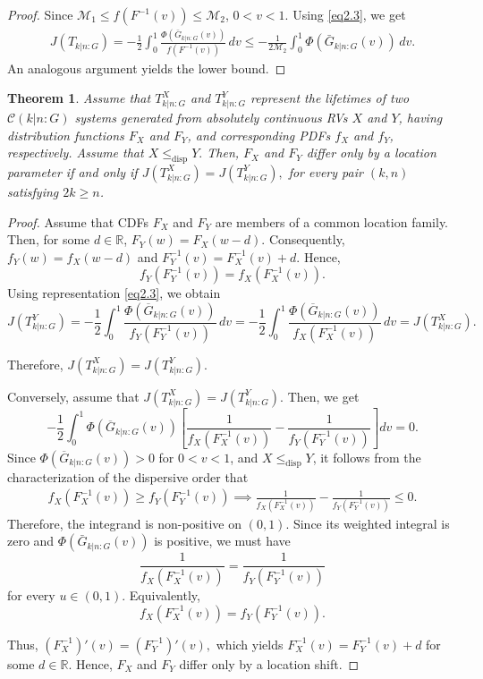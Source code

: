 \documentclass[12pt,a4paper]{article}
\numberwithin{equation}{section}
\newtheorem{theorem}{Theorem}[section]
\begin{document}
\begin{proof}
    Since $\mathcal M_1\leq f(F^{-1}(v))\leq \mathcal M_2$, $0<v<1$. Using \eqref{eq2.3}, we get
    \begin{align*}
        J(T_{k|n:G})=-\frac{1}{2}\int_0^1 \frac{\Phi(\bar G_{k|n:G}(v))}{f(F^{-1}(v))}\,dv\leq -\frac{1}{2\mathcal M_2}\int_0^1 \Phi(\bar G_{k|n:G}(v))\,dv.
    \end{align*}
   An analogous argument yields the lower bound.
    \end{proof}
 \begin{theorem}\label{th2.5}
Assume that $T_{k|n:G}^{X}$ and $T_{k|n:G}^{Y}$ represent the lifetimes of two $\mathcal C(k|n{:}G)$ systems generated from absolutely continuous RVs $X$ and $Y$, having distribution functions $F_X$ and $F_Y$, and corresponding PDFs $f_X$ and $f_Y$, respectively. Assume that $X \leq_{\mathrm{disp}} Y.$
Then, $F_X$ and $F_Y$ differ only by a location parameter if and only if ${J}\!\left(T_{k|n:G}^{X}\right)
=
{J}\!\left(T_{k|n:G}^{Y}\right),$
for every pair $(k,n)$ satisfying $2k\ge n$.
\end{theorem}
\begin{proof}
Assume that CDFs $F_X$ and $F_Y$ are members of a common location family. Then, for some $d\in\mathbb{R}$,
$
F_Y(w)=F_X(w-d).
$
Consequently,
$
f_Y(w)=f_X(w-d)
$
and
$
F_Y^{-1}(v)=F_X^{-1}(v)+d.
$
Hence,
$$
f_Y(F_Y^{-1}(v))
=
f_X(F_X^{-1}(v)).
$$
Using representation \eqref{eq2.3}, we obtain
$$
J(T_{k|n:G}^{Y})
=
-\frac12\int_0^1
\frac{\Phi(\overline G_{k|n:G}(v))}
{f_Y(F_Y^{-1}(v))}\,dv
=-\frac12
\int_0^1
\frac{\Phi(\overline G_{k|n:G}(v))}
{f_X(F_X^{-1}(v))}\,dv
=
{J}(T_{k|n:G}^{X}).
$$

Therefore,
$
{J}(T_{k|n:G}^{X})
=
{J}(T_{k|n:G}^{Y}).
$

Conversely, assume that 
$
{J}(T_{k|n:G}^{X})
=
{J}(T_{k|n:G}^{Y}).
$ Then, we get
$$
-\frac12\int_{0}^{1}
\Phi(\overline G_{k|n:G}(v))
\left[
\frac{1}{f_X(F_X^{-1}(v))}
-
\frac{1}{f_Y(F_Y^{-1}(v))}
\right]dv
=0.
$$
Since
$
\Phi(\overline G_{k|n:G}(v))>0
$
for $0<v<1$, and $X\leq_{\mathrm{disp}}Y$, it follows from the characterization of the dispersive order that
\begin{align*}
    f_X(F_X^{-1}(v))
\ge
f_Y(F_Y^{-1}(v))\implies \frac{1}{f_X(F_X^{-1}(v))}
-
\frac{1}{f_Y(F_Y^{-1}(v))}
\le 0.
\end{align*}
Therefore, the integrand is non-positive on $(0,1)$. Since its weighted integral is zero and $\Phi(\bar G_{k|n:G}(v))$ is positive, we must have
$$
\frac{1}{f_X(F_X^{-1}(v))}
=
\frac{1}{f_Y(F_Y^{-1}(v))}
$$
for every $u\in(0,1)$. Equivalently,
$$
f_X(F_X^{-1}(v))
=
f_Y(F_Y^{-1}(v)).
$$

Thus,
$
(F_X^{-1})'(v)
=
(F_Y^{-1})'(v),
$
which yields
$
F_X^{-1}(v)=F_Y^{-1}(v)+d
$
for some $d\in\mathbb{R}$. Hence, $F_X$ and $F_Y$ differ only by a location shift.
\end{proof}
\end{document}
